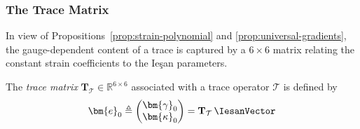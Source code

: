 \subsubsection{The Trace Matrix}

In view of Propositions~\ref{prop:strain-polynomial} and \ref{prop:universal-gradients}, 
the gauge-dependent content of a trace is captured by a $6 \times 6$ matrix 
relating the constant strain coefficients to the Ieşan parameters.

\begin{definition}
The \emph{trace matrix} $\mathbf{T}_{\mathcal{T}} \in \mathbb{R}^{6 \times 6}$ 
associated with a trace operator $\mathcal{T}$ is defined by
\begin{equation}
\bm{e}_0 \triangleq \begin{pmatrix} \bm{\gamma}_0 \\ \bm{\kappa}_0 \end{pmatrix} 
= \mathbf{T}_{\mathcal{T}} \, \IesanVector
\label{eq:def-trace-matrix}
\end{equation}
\end{definition}

